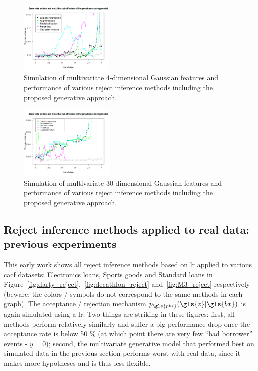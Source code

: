 \begin{figure}[H]
\centering
\includegraphics[width=0.4\textwidth]{figures/appendix/rejectinferencesimulation4var.png}
\caption{Simulation of multivariate 4-dimensional Gaussian features and performance of various reject inference methods including the proposed generative approach.}
\label{fig:simu_4var}
\end{figure}

\begin{figure}[H]
\centering
\includegraphics[width=0.4\textwidth]{figures/appendix/rejectinferencesimulation30var.png}
\caption{Simulation of multivariate 30-dimensional Gaussian features and performance of various reject inference methods including the proposed generative approach.}
\label{fig:simu_30var}
\end{figure}


\subsection{Reject inference methods applied to real data: previous experiments} \label{subsec:app_reject_real}

This early work shows all reject inference methods based on \gls{lr} applied to various \gls{cacf} datasets: Electronics loans, Sports goods and Standard loans in Figure~\ref{fig:darty_reject},~\ref{fig:decathlon_reject} and~\ref{fig:M3_reject} respectively (beware: the colors / symbols do not correspond to the same methods in each graph). The acceptance / rejection mechanism $p_{\gls{phi}}(\gls{z} | \gls{bx})$ is again simulated using a \gls{lr}. Two things are striking in these figures: first, all methods perform relatively similarly and suffer a big performance drop once the acceptance rate is below 50 \% (at which point there are very few ``bad borrower'' events - $y = 0$); second, the multivariate generative model that performed best on simulated data in the previous section performs worst with real data, since it makes more hypotheses and is thus less flexible.

